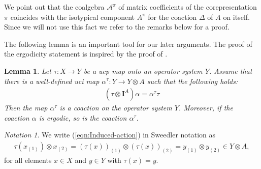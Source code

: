 \documentclass{amsart}
\theoremstyle{plain}
\newtheorem{lemma}[theorem]{Lemma}
\theoremstyle{definition}
\theoremstyle{remark}
\newtheorem{notation}[theorem]{Notation}
\begin{document}
	We point out that the coalgebra $\mathcal{A}^\pi$ of matrix coefficients of the corepresentation $\pi$ coincides with the isotypical component $A^\pi$ for the coaction $\Delta$ of $A$ on itself.
	Since we will not use this fact we refer to the remarks below \cite[Definition 3.13]{DC16} for a proof.
	
	The following lemma is an important tool for our later arguments. 
	The proof of the ergodicity statement is inspired by the proof of \cite[Proposition 9]{GEvS23}.
	
	\begin{lemma}\label{lem:Induced-action}
		Let $\tau : X \rightarrow Y$ be a ucp map onto an operator system $Y$.
		Assume that there is a well-defined uci map $\alpha^\tau : Y \rightarrow Y \otimes A$ such that the following holds:
		\begin{align}\label{eqn:Induced-action}
			(\tau \otimes \mathbf{I}^A) \alpha = \alpha^\tau \tau
		\end{align}
		Then the map $\alpha^\tau$ is a coaction on the operator system $Y$.
		Moreover, if the coaction $\alpha$ is ergodic, so is the coaction $\alpha^\tau$.
	\end{lemma}
	
	\begin{notation}
		We write (\ref{eqn:Induced-action}) in Sweedler notation as
		\begin{align}\label{eqn:Induced-action-Sweedler}
			\tau(x_{(1)}) \otimes x_{(2)} 
			= (\tau(x))_{(1)} \otimes (\tau(x))_{(2)}
			= y_{(1)} \otimes y_{(2)} \in Y \otimes A,
		\end{align}
		for all elements $x \in X$ and $y \in Y$ with $\tau(x) = y$.
	\end{notation}
	
\end{document}
